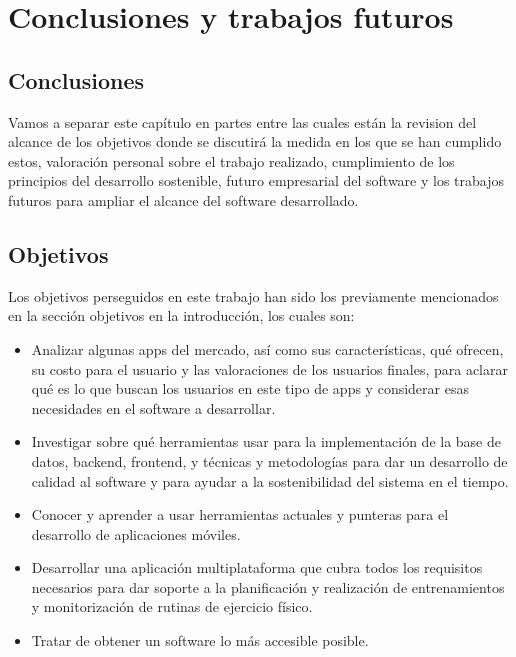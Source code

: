 \chapter{Conclusiones y trabajos futuros}

\section{Conclusiones}

Vamos a separar este capítulo en partes entre las cuales están la revision del alcance de los objetivos donde se discutirá la medida en los que se han cumplido estos, valoración personal sobre el trabajo realizado, cumplimiento de los principios del desarrollo sostenible, futuro empresarial del software y los trabajos futuros para ampliar el alcance del software desarrollado.

\section{Objetivos}

Los objetivos perseguidos en este trabajo han sido los previamente mencionados en la sección objetivos en la introducción, los cuales son:
\begin{itemize}
	\item Analizar algunas apps del mercado, así como sus características, qué ofrecen, su costo para el usuario y las valoraciones de los usuarios finales, para aclarar qué es lo que buscan los usuarios en este tipo de apps y considerar esas necesidades en el software a desarrollar.
	\item Investigar sobre qué herramientas usar para la implementación de la base de datos, backend, frontend, y técnicas y metodologías para dar un desarrollo de calidad al software y para ayudar a la sostenibilidad del sistema en el tiempo.
	\item Conocer y aprender a usar herramientas actuales y punteras para el desarrollo de aplicaciones móviles. 
	\item Desarrollar una aplicación multiplataforma que cubra todos los requisitos necesarios para dar soporte a la planificación y realización de entrenamientos y monitorización de rutinas de ejercicio físico. 
	\item Tratar de obtener un software lo más accesible posible.
\end{itemize}


